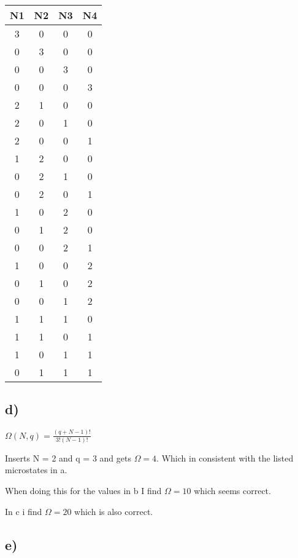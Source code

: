 \documentclass[12pt]{article}
\begin{document}
\begin{table}[hb!]
\begin{tabular}{c|c|c|c}
N1 & N2 & N3 & N4 \\
\hline
3 & 0 & 0 & 0 \\
0 & 3 & 0 & 0 \\
0 & 0 & 3 & 0 \\
0 & 0 & 0 & 3 \\
2 & 1 & 0 & 0 \\
2 & 0 & 1 & 0 \\
2 & 0 & 0 & 1 \\
1 & 2 & 0 & 0 \\
0 & 2 & 1 & 0 \\
0 & 2 & 0 & 1 \\
1 & 0 & 2 & 0 \\
0 & 1 & 2 & 0 \\
0 & 0 & 2 & 1 \\
1 & 0 & 0 & 2 \\
0 & 1 & 0 & 2 \\
0 & 0 & 1 & 2 \\
1 & 1 & 1 & 0 \\
1 & 1 & 0 & 1 \\
1 & 0 & 1 & 1 \\
0 & 1 & 1 & 1 \\

\end{tabular}
\end{table}


\subsection*{d)}

$\Omega(N,q) = \frac{(q + N -1)!}{3!(N-1)!} $

Inserts N = 2 and q = 3 and gets $\Omega = 4$. Which in consistent with the listed microstates in a. 

When doing this for the values in b I find $\Omega = 10$ which seems correct. 

In c i find $\Omega = 20 $ which is also correct. 


\subsection*{e)}
\end{document}
